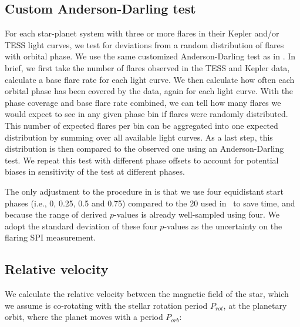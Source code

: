 \documentclass[twocolumn]{aastex631}
\begin{document}
\subsection{Custom Anderson-Darling test}
\label{sec:methods:adtest}
For each star-planet system with three or more flares in their Kepler and/or TESS light curves, we test for deviations from a random distribution of flares with orbital phase. We use the same customized Anderson-Darling test as in \cite{ilin2022searching}. In brief, we first take the number of flares observed in the TESS and Kepler data, calculate a base flare rate for each light curve. We then calculate how often each orbital phase has been covered by the data, again for each light curve. With the phase coverage and base flare rate combined, we can tell how many flares we would expect to see in any given phase bin if flares were randomly distributed. This number of expected flares per bin can be aggregated into one expected distribution by summing over all available light curves. As a last step, this distribution is then compared to the observed one using an Anderson-Darling test. We repeat this test with different phase offsets to account for potential biases in sensitivity of the test at different phases.

The only adjustment to the procedure in \cite{ilin2022searching} is that we use four equidistant start phases (i.e., 0, 0.25, 0.5 and 0.75) compared to the 20 used in~\cite{ilin2022searching} to save time, and because the range of derived $p$-values is already well-sampled using four. We adopt the standard deviation of these four $p$-values as the uncertainty on the flaring SPI measurement.





\subsection{Relative velocity}
\label{sec:methods:relvel}
We calculate the relative velocity between the magnetic field of the star, which we assume is co-rotating with the stellar rotation period $P_{rot}$, at the planetary orbit, where the planet moves with a period $P_{orb}$:
\end{document}
